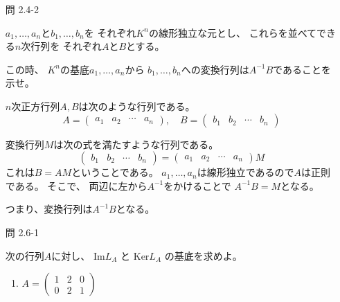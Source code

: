 \documentclass[12pt,b5paper]{ltjsarticle}
\begin{document}
\begin{enumerate}
       \hrulefill


 \item [問 2.4-2]

       $a_1,\dots,a_n$と$b_1,\dots,b_n$を
       それぞれ$K^n$の線形独立な元とし、
       これらを並べてできる$n$次行列を
       それぞれ$A$と$B$とする。

       この時、
       $K^n$の基底$a_1,\dots,a_n$から
       $b_1,\dots,b_n$への変換行列は$A^{-1}B$であることを示せ。

       \dotfill

       $n$次正方行列$A,B$は次のような行列である。
       \begin{equation}
        A=\begin{pmatrix} a_1 & a_2 & \cdots & a_n \end{pmatrix}
        ,\quad
        B=\begin{pmatrix} b_1 & b_2 & \cdots & b_n \end{pmatrix}
       \end{equation}

       変換行列$M$は次の式を満たすような行列である。
       \begin{equation}
        \begin{pmatrix} b_1 & b_2 & \cdots & b_n \end{pmatrix}
        =
         \begin{pmatrix} a_1 & a_2 & \cdots & a_n \end{pmatrix}
         M
       \end{equation}
       これは$B=AM$ということである。
       $a_1,\dots,a_n$は線形独立であるので$A$は正則である。
       そこで、
       両辺に左から$A^{-1}$をかけることで
       $A^{-1}B=M$となる。

       つまり、変換行列は$A^{-1}B$となる。

       \hrulefill


 \item [問 2.6-1]

       次の行列$A$に対し、
       $\mathrm{Im}L_A$
       と
       $\mathrm{Ker}L_A$
       の基底を求めよ。

       \begin{enumerate}
        \item
             $A=\begin{pmatrix} 1 & 2 & 0 \\ 0 & 2 & 1 \end{pmatrix}$

             \dotfill


\end{enumerate}
\end{enumerate}
\end{document}
